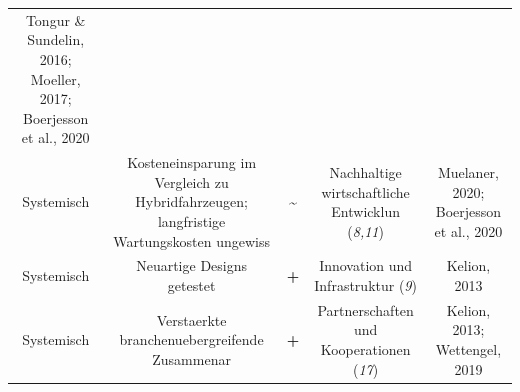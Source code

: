 \documentclass[
]{book}
\begin{document}
\begin{longtable}[]{@{}ccccc@{}}
\begin{minipage}[t]{0.17\columnwidth}
Tongur \& Sundelin, 2016; Moeller, 2017; Boerjesson et al., 2020\strut
\end{minipage}\tabularnewline
\begin{minipage}[t]{0.17\columnwidth}\centering
Systemisch\strut
\end{minipage} & \begin{minipage}[t]{0.16\columnwidth}\centering
Kosteneinsparung im Vergleich zu Hybridfahrzeugen; langfristige Wartungskosten ungewiss\strut
\end{minipage} & \begin{minipage}[t]{0.17\columnwidth}\centering
\textbf{\textasciitilde{}}\strut
\end{minipage} & \begin{minipage}[t]{0.17\columnwidth}\centering
Nachhaltige wirtschaftliche Entwicklun (\emph{8,11})\strut
\end{minipage} & \begin{minipage}[t]{0.17\columnwidth}\centering
Muelaner, 2020; Boerjesson et al., 2020\strut
\end{minipage}\tabularnewline
\begin{minipage}[t]{0.17\columnwidth}\centering
Systemisch\strut
\end{minipage} & \begin{minipage}[t]{0.16\columnwidth}\centering
Neuartige Designs getestet\strut
\end{minipage} & \begin{minipage}[t]{0.17\columnwidth}\centering
\textbf{+}\strut
\end{minipage} & \begin{minipage}[t]{0.17\columnwidth}\centering
Innovation und Infrastruktur (\emph{9})\strut
\end{minipage} & \begin{minipage}[t]{0.17\columnwidth}\centering
Kelion, 2013\strut
\end{minipage}\tabularnewline
\begin{minipage}[t]{0.17\columnwidth}\centering
Systemisch\strut
\end{minipage} & \begin{minipage}[t]{0.16\columnwidth}\centering
Verstaerkte branchenuebergreifende Zusammenar\strut
\end{minipage} & \begin{minipage}[t]{0.17\columnwidth}\centering
\textbf{+}\strut
\end{minipage} & \begin{minipage}[t]{0.17\columnwidth}\centering
Partnerschaften und Kooperationen (\emph{17})\strut
\end{minipage} & \begin{minipage}[t]{0.17\columnwidth}\centering
Kelion, 2013; Wettengel, 2019\strut
\end{minipage}\tabularnewline
\bottomrule
\end{longtable}
\end{document}
